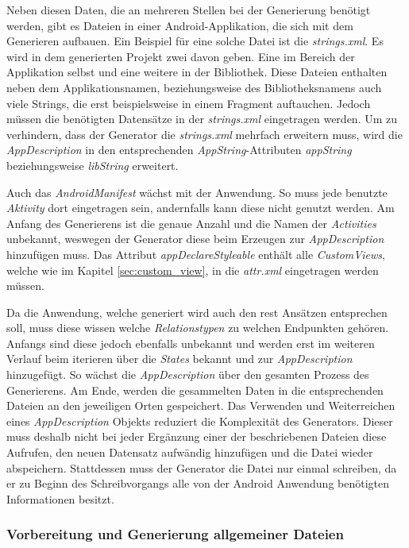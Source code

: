 \newpage

Neben diesen Daten, die an mehreren Stellen bei der Generierung benötigt werden, gibt es Dateien in einer Android-Applikation, die sich mit dem Generieren aufbauen. Ein Beispiel für eine solche Datei ist die \textit{strings.xml}. 
Es wird in dem generierten Projekt zwei davon geben. Eine im Bereich der Applikation selbst und eine weitere in der Bibliothek. Diese Dateien enthalten neben dem Applikationsnamen, beziehungsweise des Bibliotheksnamens auch viele Strings, die erst beispielsweise in einem Fragment auftauchen. Jedoch müssen die benötigten Datensätze in der \textit{strings.xml} eingetragen werden. Um zu verhindern, dass der Generator die \textit{strings.xml} mehrfach erweitern muss, wird die \textit{AppDescription} in den entsprechenden \textit{AppString}-Attributen \textit{appString} beziehungsweise \textit{libString} erweitert.

Auch das \textit{AndroidManifest} wächst mit der Anwendung. So muss jede benutzte \textit{Aktivity} dort eingetragen sein, andernfalls kann diese nicht genutzt werden. Am Anfang des Generierens ist die genaue Anzahl und die Namen der \textit{Activities} unbekannt, weswegen der Generator diese beim Erzeugen zur \textit{AppDescription} hinzufügen muss. 
Das Attribut \textit{appDeclareStyleable} enthält alle \textit{CustomViews}, welche wie im Kapitel \ref{sec:custom_view}, in die \textit{attr.xml} eingetragen werden müssen.

Da die Anwendung, welche generiert wird auch den \acf{rest} Ansätzen entsprechen soll, muss diese wissen welche \textit{Relationstypen} zu welchen Endpunkten gehören. Anfangs sind diese jedoch ebenfalls unbekannt und werden erst im weiteren Verlauf beim iterieren über die \textit{States} bekannt und zur \textit{AppDescription} hinzugefügt.
So wächst die \textit{AppDescription} über den gesamten Prozess des Generierens. Am Ende, werden die gesammelten Daten in die entsprechenden Dateien an den jeweiligen Orten gespeichert. Das Verwenden und Weiterreichen eines \textit{AppDescription} Objekts reduziert die Komplexität des Generators. Dieser muss deshalb nicht bei jeder Ergänzung einer der beschriebenen Dateien diese Aufrufen, den neuen Datensatz aufwändig hinzufügen und die Datei wieder abspeichern. Stattdessen muss der Generator die Datei nur einmal schreiben, da er zu Beginn des Schreibvorgangs alle von der Android Anwendung benötigten Informationen besitzt.

\subsubsection{Vorbereitung und Generierung allgemeiner Dateien}


